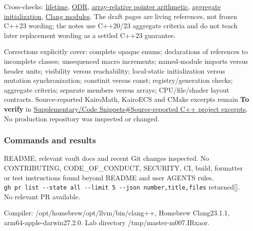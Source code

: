 Cross-checks: \href{https://eel.is/c++draft/basic.life}{lifetime}, \href{https://eel.is/c++draft/basic.def.odr}{ODR}, \href{https://eel.is/c++draft/expr.add}{array-relative pointer arithmetic}, \href{https://eel.is/c++draft/dcl.init.aggr}{aggregate initialization}, \href{https://clang.llvm.org/docs/StandardCPlusPlusModules.html}{Clang modules}. The draft pages are living references, not frozen C++23 wording; the notes use C++20/23 aggregate criteria and do not teach later replacement wording as a settled C++23 guarantee.

Corrections explicitly cover: complete opaque enums; declarations of references to incomplete classes; unsequenced macro increments; named-module imports versus header units; visibility versus reachability; local-static initialization versus mutation synchronization; constinit versus const; registry/generation checks; aggregate criteria; separate members versus arrays; CPU/file/shader layout contracts. Source-reported KairoMath, KairoECS and CMake excerpts remain \textbf{To verify} in \hyperref[appendix-4e2236f53445-source-reported-c-project-excerpts]{Supplementary/Code Snippets\#Source-reported C++ project excerpts}. No production repository was inspected or changed.

\subsubsection{Commands and results}\label{appendix-a103e7846d21-commands-and-results}

\hypertarget{appendix-a103e7846d21-commands-and-results}{}

README, relevant vault docs and recent Git changes inspected. No CONTRIBUTING, CODE\_OF\_CONDUCT, SECURITY, CI, build, formatter or test instructions found beyond README and user AGENTS rules. \texttt{gh\ pr\ list\ -\/-state\ all\ -\/-limit\ 5\ -\/-json\ number,title,files} returned{[}{]}. No relevant PR available.

Compiler: /opt/homebrew/opt/llvm/bin/clang++, Homebrew Clang23.1.1, arm64-apple-darwin27.2.0. Lab directory /tmp/master-m007.IRxaor.

